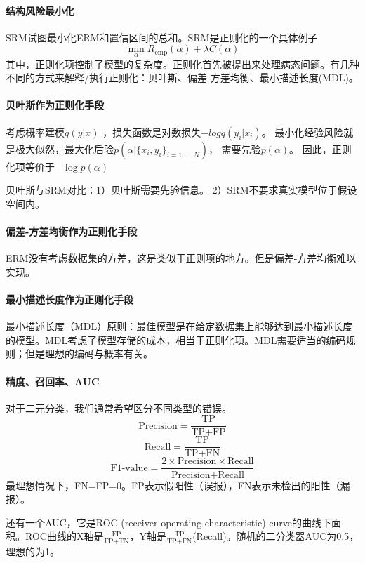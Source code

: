\paragraph{结构风险最小化}
SRM试图最小化ERM和置信区间的总和。SRM是正则化的一个具体例子
$$\min_\alpha R_\text{emp}(\alpha) + \lambda C(\alpha)$$
其中，正则化项控制了模型的复杂度。正则化首先被提出来处理病态问题。有几种不同的方式来解释/执行正则化：贝叶斯、偏差-方差均衡、最小描述长度(MDL)。

\paragraph{贝叶斯作为正则化手段}
考虑概率建模$q(y|x)$
，损失函数是对数损失$-log q(y_i|x_i)$。
最小化经验风险就是极大似然，最大化后验$p(\alpha | \{x_i, y_i\}_{i = 1,\ldots, N})$，
需要先验$p(\alpha)$。
因此，正则化项等价于$-\log p(\alpha)$

贝叶斯与SRM对比：1）贝叶斯需要先验信息。
2）SRM不要求真实模型位于假设空间内。

\paragraph{偏差-方差均衡作为正则化手段} ERM没有考虑数据集的方差，这是类似于正则项的地方。但是偏差-方差均衡难以实现。

\paragraph{最小描述长度作为正则化手段} 最小描述长度（MDL）原则：最佳模型是在给定数据集上能够达到最小描述长度的模型。MDL考虑了模型存储的成本，相当于正则化项。MDL需要适当的编码规则；但是理想的编码与概率有关。

\paragraph{精度、召回率、AUC}
对于二元分类，我们通常希望区分不同类型的错误。
$$\text{Precision} = \frac{\text{TP}}{\text{TP} + \text{FP}}$$
$$\text{Recall} = \frac{\text{TP}}{\text{TP} + \text{FN}}$$
$$\text{F1-value} = \frac{2\times\text{Precision}\times\text{Recall}}{\text{Precision} + \text{Recall}}$$
最理想情况下，FN=FP=0。FP表示假阳性（误报），FN表示未检出的阳性（漏报）。

还有一个AUC，它是ROC (receiver operating characteristic) curve的曲线下面积。ROC曲线的X轴是$\frac{\text{FP}}{\text{FP} + \text{TN}}$，Y轴是$\frac{\text{TP}}{\text{TP} + \text{FN}}$(Recall)。随机的二分类器AUC为0.5，理想的为1。

